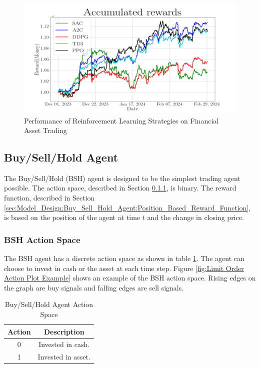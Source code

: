 \documentclass[journal]{new-aiaa}
\begin{document}


\begin{figure}[hbt!]
        \centering
        \includegraphics[width=.6\textwidth]{figures/Accumulated_Rewards_Reference.png}
        \caption{Performance of Reinforcement Learning Strategies on Financial Asset Trading \cite{RLinFinance}}
        \label{fig:Accumulated_Rewards_Reference}
\end{figure}

\subsection{Buy/Sell/Hold Agent}\label{sec:Model_Design:Buy_Sell_Hold_Agent}
The Buy/Sell/Hold (BSH) agent is designed to be the simplest trading agent possible.
The action space, described in Section \ref{sec:Model_Design:Buy_Sell_Hold_Agent:BSH_Action_Space}, is binary.
The reward function, described in Section \ref{sec:Model_Design:Buy_Sell_Hold_Agent:Position_Based_Reward_Function}, is based on the position of the agent at time $t$ and the change in closing price.

\subsubsection{BSH Action Space}\label{sec:Model_Design:Buy_Sell_Hold_Agent:BSH_Action_Space}
The BSH agent has a discrete action space as shown in table \ref{tab:Buy_Sell_Hold_Agent_Action_Space}.
The agent can choose to invest in cash or the asset at each time step.
Figure \ref{fig:Limit Order Action Plot Example} shows an example of the BSH action space.
Rising edges on the graph are buy signals and falling edges are sell signals.

\begin{table}[hbt!]
        \centering
        \begin{tabular}{||c|c||}
                \hline
                \textbf{Action} & \textbf{Description} \\
                \hline
                \hline
                0 & Invested in cash. \\
                \hline
                1 & Invested in asset. \\
                \hline
        \end{tabular}
        \caption{Buy/Sell/Hold Agent Action Space}
        \label{tab:Buy_Sell_Hold_Agent_Action_Space}
\end{table}
\end{document}
